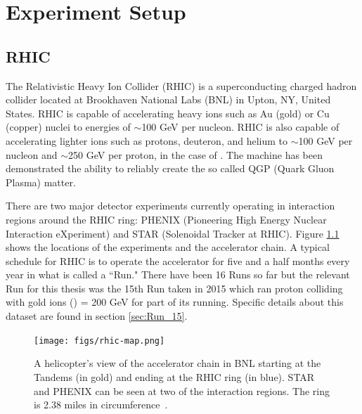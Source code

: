 \chapter{Experiment Setup}
\section{RHIC}
The Relativistic Heavy Ion Collider (RHIC) is a superconducting charged hadron collider located at Brookhaven National Labs (BNL) in Upton, NY, United States. RHIC is capable of accelerating heavy ions such as Au (gold) or Cu (copper) nuclei to energies of $\sim$100 GeV per nucleon. RHIC is also capable of accelerating lighter ions such as protons, deuteron, and helium to $\sim	$100 GeV per nucleon and $\sim$250 GeV per proton, in the case of \pp. The machine has been demonstrated the ability to reliably create the so called QGP (Quark Gluon Plasma) matter.

There are two major detector experiments currently operating in interaction regions around the RHIC ring: PHENIX (Pioneering High Energy Nuclear Interaction eXperiment) and STAR (Solenoidal Tracker at RHIC). Figure \ref{fig:rhic_heli_photo} shows the locations of the experiments and the accelerator chain. A typical schedule for RHIC is to operate the accelerator for five and a half months every year in what is called a ``Run." There have been 16 Runs so far but the relevant Run for this thesis was the 15th Run taken in 2015 which ran proton colliding with gold ions (\pau) \sqsn = 200 GeV for part of its running. Specific details about this dataset are found in section \ref{sec:Run_15}.

\begin{figure}[!ht]
\begin{center}
\texttt{[image: figs/rhic-map.png]}
\caption{A helicopter's view of the accelerator chain in BNL starting at the Tandems (in gold) and ending at the RHIC ring (in blue). STAR and PHENIX can be seen at two of the interaction regions. The ring is 2.38 miles in circumference~\cite{Tannenbaum:2013wkn}.}
\label{fig:rhic_heli_photo}
\end{center}
\end{figure}

